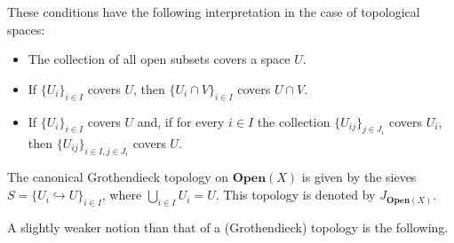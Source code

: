     \begin{example}
        These conditions have the following interpretation in the case of topological spaces:
        \begin{itemize}
            \item The collection of all open subsets covers a space $U$.
            \item If $\{U_i\}_{i\in I}$ covers $U$, then $\{U_i\cap V\}_{i\in I}$ covers $U\cap V$.
            \item If $\{U_i\}_{i\in I}$ covers $U$ and, if for every $i\in I$ the collection $\{U_{ij}\}_{j\in J_i}$ covers $U_i$, then $\{U_{ij}\}_{i\in I,j\in J_i}$ covers $U$.
        \end{itemize}
        The canonical Grothendieck topology on $\mathbf{Open}(X)$ is given by the sieves $S=\{U_i\hookrightarrow U\}_{i\in I}$, where $\bigcup_{i\in I}U_i=U$. This topology is denoted by $J_{\mathbf{Open}(X)}$.
    \end{example}


    A slightly weaker notion than that of a (Grothendieck) topology is the following.

